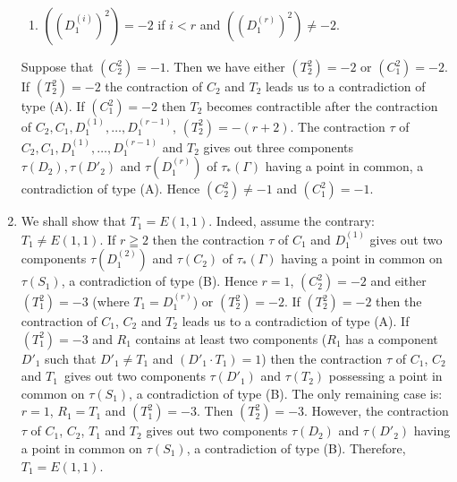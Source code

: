 \begin{enumerate}
\begin{enumerate}
\item $((D^{(i)}_{1})^{2})=-2$ if $i<r$ and $((D^{(r)}_{1})^{2})\neq -2$.
\end{enumerate}
Suppose that $(C^{2}_{2})=-1$. Then we have either $(T^{2}_{2})=-2$ or
$(C^{2}_{1})=-2$. If $(T^{2}_{2})=-2$ the contraction of $C_{2}$ and
$T_{2}$ leads us to a contradiction of type (A). If $(C^{2}_{1})=-2$
then $T_{2}$ becomes contractible after the contraction of
$C_{2},C_{1},D^{(1)}_{1},\ldots,D_{1}^{(r-1)}$, \iec
$(T^{2}_{2})=-(r+2)$. The contraction $\tau$ of
$C_{2},C_{1},D^{(1)}_{1},\ldots,D^{(r-1)}_{1}$ and $T_{2}$ gives out
three components $\tau(D_{2}),\tau(D'_{2})$ and $\tau(D^{(r)}_{1})$ of
$\tau_{\ast}(\Gamma)$ having a point in common, a contradiction of
type (A). Hence $(C^{2}_{2})\neq -1$ and $(C^{2}_{1})=-1$.

\item We shall show that $T_{1}=E(1,1)$. Indeed, assume the contrary:
  $T_{1}\neq E(1,1)$. If $r\geqq 2$ then the contraction $\tau$ of
  $C_{1}$ and $D_{1}^{(1)}$ gives out two components
  $\tau(D^{(2)}_{1})$ and $\tau(C_{2})$ of $\tau_{\ast}(\Gamma)$
  having a point in common on $\tau(S_{1})$, a contradiction of type
  (B). Hence $r=1$, $(C^{2}_{2})=-2$ and either $(T^{2}_{1})=-3$
  (where $T_{1}=D_{1}^{(r)}$) or $(T^{2}_{2})=-2$. If $(T^{2}_{2})=-2$
  then the contraction of $C_{1}$, $C_{2}$ and $T_{2}$ leads us to a
  contradiction of type (A). If $(T^{2}_{1})=-3$ and $R_{1}$ contains
  at least two components (\iec $R_{1}$ has a component $D'_{1}$ such
  that $D'_{1}\neq T_{1}$ and $(D'_{1}\cdot T_{1})=1$) then the
  contraction $\tau$ of $C_{1}$, $C_{2}$ and $T_{1}$\pageoriginale\
  gives out two components $\tau(D'_{1})$ and $\tau(T_{2})$ possessing
  a point in common on $\tau(S_{1})$, a contradiction of type (B). The
  only remaining case is: $r=1$, $R_{1}=T_{1}$ and
  $(T^{2}_{1})=-3$. Then $(T^{2}_{2})=-3$. However, the contraction
  $\tau$ of $C_{1}$, $C_{2}$, $T_{1}$ and $T_{2}$ gives out two
  components $\tau(D_{2})$ and $\tau(D'_{2})$ having a point in common
  on $\tau(S_{1})$, a contradiction of type (B). Therefore,
  $T_{1}=E(1,1)$.


\end{enumerate}
